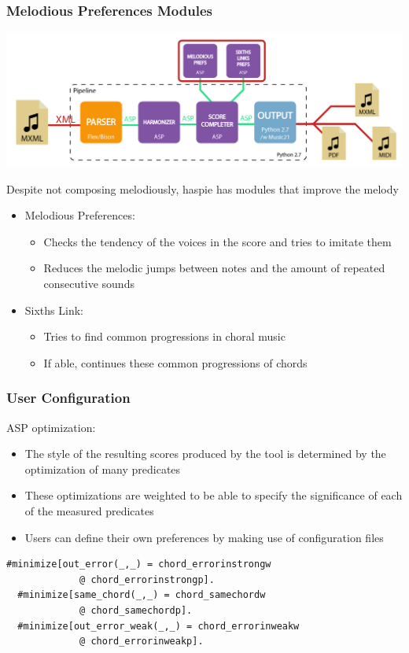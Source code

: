 \documentclass[english,fragile]{beamer}
\begin{document}
	\begin{frame}[t,fragile]
	\frametitle{Melodious Preferences Modules}
	\begin{center}
			\includegraphics[width=0.6\linewidth]{imagenes/arch_trans/arquitectura_final_asp_modules-01.png}
			\end{center}
	Despite not composing melodiously, haspie has modules that \alert{improve the melody}
	\pause
	\begin{itemize}
		\item \alert{Melodious Preferences}:
		\begin{itemize}
			\item Checks the tendency of the voices in the score and tries to imitate them
			\item Reduces the melodic jumps between notes and the amount of repeated consecutive sounds
		\end{itemize}
		\item \alert{Sixths Link}:
		\begin{itemize}
			\item Tries to find common progressions in choral music
			\item If able, continues these common progressions of chords
		\end{itemize}
	\end{itemize}
\end{frame}
	\begin{frame}[fragile]
	\frametitle{User Configuration}
		ASP optimization:
		\begin{itemize}
			\item The \alert{style} of the resulting scores produced by the tool is determined by the optimization of many predicates
			\pause
			\item These optimizations are \alert{weighted} to be able to specify the significance of each of the measured predicates
			\pause
			\item Users can \alert{define their own preferences} by making use of configuration files
		\end{itemize}
		\begin{Verbatim}[frame=single]
  #minimize[out_error(_,_) = chord_errorinstrongw 
             @ chord_errorinstrongp].
  #minimize[same_chord(_,_) = chord_samechordw
             @ chord_samechordp].
  #minimize[out_error_weak(_,_) = chord_errorinweakw 
             @ chord_errorinweakp].
		\end{Verbatim}
\end{frame}
\end{document}
